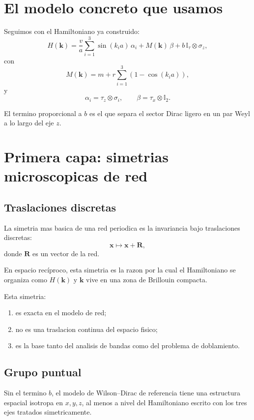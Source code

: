 \section{El modelo concreto que usamos}
Seguimos con el Hamiltoniano ya construido:
\begin{equation}
H(\bm{k})=
\frac{v}{a}\sum_{i=1}^3 \sin(k_i a)\,\alpha_i
+
M(\bm{k})\,\beta
+
b\,\mathbb{I}_\tau\otimes \sigma_z,
\label{c11:eq:H}
\end{equation}
con
\begin{equation}
M(\bm{k})=
m+r\sum_{i=1}^3\left(1-\cos(k_i a)\right),
\label{c11:eq:M}
\end{equation}
y
\begin{equation}
\alpha_i=\tau_z\otimes \sigma_i,
\qquad
\beta=\tau_x\otimes \mathbb{I}_2.
\label{c11:eq:ab}
\end{equation}

El termino proporcional a \(b\) es el que separa el sector Dirac ligero en un par Weyl a lo largo del eje \(z\).

\section{Primera capa: simetrias microscopicas de red}
\subsection{Traslaciones discretas}
La simetria mas basica de una red periodica es la invariancia bajo traslaciones discretas:
\begin{equation}
\bm{x}\mapsto \bm{x}+\bm{R},
\end{equation}
donde \(\bm{R}\) es un vector de la red.

En espacio recíproco, esta simetria es la razon por la cual el Hamiltoniano se organiza como \(H(\bm{k})\) y \(\bm{k}\) vive en una zona de Brillouin compacta.

Esta simetria:
\begin{enumerate}[label=\arabic*.]
    \item es exacta en el modelo de red;
    \item no es una traslacion continua del espacio fisico;
    \item es la base tanto del analisis de bandas como del problema de doblamiento.
\end{enumerate}

\subsection{Grupo puntual}
Sin el termino \(b\), el modelo de Wilson--Dirac de referencia tiene una estructura espacial isotropa en \(x,y,z\), al menos a nivel del Hamiltoniano escrito con los tres ejes tratados simetricamente.

